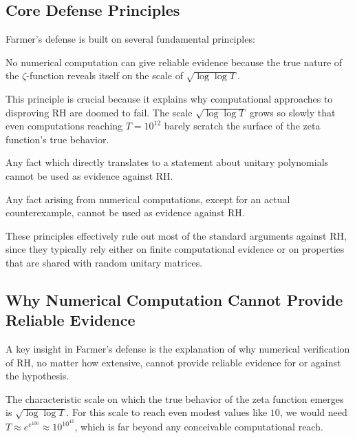 \subsection{Core Defense Principles}
\label{subsec:defense_principles}

Farmer's defense is built on several fundamental principles:

\begin{principle}
No numerical computation can give reliable evidence because the true nature of the $\zeta$-function reveals itself on the scale of $\sqrt{\log \log T}$.
\end{principle}

This principle is crucial because it explains why computational approaches to disproving RH are doomed to fail. The scale $\sqrt{\log \log T}$ grows so slowly that even computations reaching $T = 10^{12}$ barely scratch the surface of the zeta function's true behavior.

\begin{principle}
Any fact which directly translates to a statement about unitary polynomials cannot be used as evidence against RH.
\end{principle}

\begin{principle}
Any fact arising from numerical computations, except for an actual counterexample, cannot be used as evidence against RH.
\end{principle}

These principles effectively rule out most of the standard arguments against RH, since they typically rely either on finite computational evidence or on properties that are shared with random unitary matrices.

\subsection{Why Numerical Computation Cannot Provide Reliable Evidence}
\label{subsec:numerical_limitations}

A key insight in Farmer's defense is the explanation of why numerical verification of RH, no matter how extensive, cannot provide reliable evidence for or against the hypothesis.

\begin{theorem}
The characteristic scale on which the true behavior of the zeta function emerges is $\sqrt{\log \log T}$. For this scale to reach even modest values like $10$, we would need $T \approx e^{e^{100}} \approx 10^{10^{43}}$, which is far beyond any conceivable computational reach.
\end{theorem}

